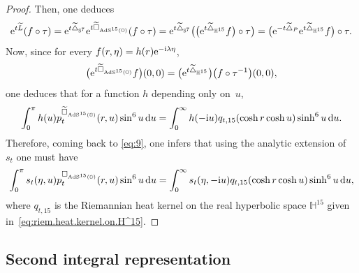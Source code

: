\documentclass[pdftex]{sigma}
\numberwithin{equation}{section}
\begin{document}
\begin{proof}
Then, one deduces
\begin{equation*}
{\rm e}^{t\widetilde{L}}(f\circ \tau)={\rm e}^{t\widetilde{\triangle}_{\mathbb{S}^7}}{\rm e}^{t\widetilde{\square}_{{\rm AdS}^{15}(\mathbb{O})}}(f \circ \tau)={\rm e}^{t\widetilde{\triangle}_{\mathbb{S}^7}}\big(\big({\rm e}^{t{\widetilde{\triangle}_{\mathbb{H}^{15}}}}f\big) \circ \tau\big)=\big({\rm e}^{-t\widetilde{\triangle}_{P}}{\rm e}^{t{\widetilde{\triangle}_{\mathbb{H}^{15}}}}f\big) \circ \tau.
\end{equation*}
Now, since for every $f(r,\eta)=h(r){\rm e}^{-{\rm i}\lambda \eta}$,
\begin{equation*}
\big({\rm e}^{t\widetilde{\square}_{{\rm AdS}^{15}(\mathbb{O})}}f\big)(0,0)=\big({\rm e}^{t{\widetilde{\triangle}_{\mathbb{H}^{15}}}}\big)\big(f\circ \tau^{-1}\big)(0,0),
\end{equation*}
one deduces that for a function $h$ depending only on~$u$,
\begin{equation*}
\int_{0}^{\pi}h(u)p^{\widetilde{\square}_{{\rm AdS}^{15}(\mathbb{O})}}_t(r,u)\sin^6u\,{\rm d}u=\int_{0}^{\infty}h(-{\rm i}u)q_{t,15}(\cosh r \cosh u) \sinh^6u\,{\rm d}u.
\end{equation*}
Therefore, coming back to \eqref{eq:9}, one infers that using the analytic extension of~$s_t$ one must have
\begin{gather*}%
\int_{0}^{\pi}s_t(\eta,u)p^{\square_{{\rm AdS}^{15}(\mathbb{O})}}_t(r,u)\sin^6u\,{\rm d}u=\int_{0}^{\infty}s_t(\eta,-{\rm i}u)q_{t,15}(\cosh r \cosh u)\sinh^6u\,{\rm d}u,
\end{gather*}
where $q_{t,15}$ is the Riemannian heat kernel on the real hyperbolic space $\mathbb{H}^{15}$ given in~\eqref{eq:riem.heat.kernel.on.H^15}.
\end{proof}

\subsection{Second integral representation}\label{section4.2}
\end{document}
